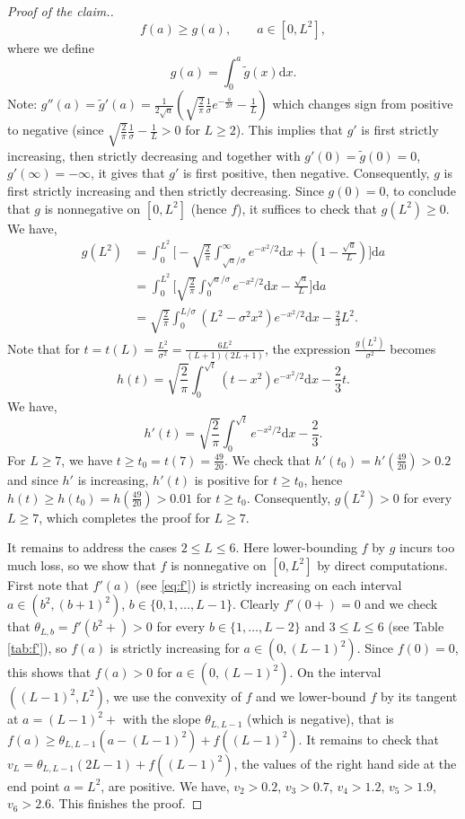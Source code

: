 \documentclass[10pt]{article}
\newcommand{\dd}{\mathrm{d}}
\newcommand{\1}{\textbf{1}}
\theoremstyle{remark}
\theoremstyle{definition}
\begin{document}
\begin{proof}[Proof of the claim.]
\[
f(a) \geq g(a), \qquad a \in [0,L^2],
\]
where we define
\[
g(a) = \int_0^a \tilde g(x)\dd x.
\]
Note: $g''(a) = \tilde g'(a) = \frac{1}{2\sqrt{a}}\left(\sqrt{\frac{2}{\pi}}\frac{1}{\sigma}e^{-\frac{a}{2\sigma}} - \frac{1}{L}\right)$ which changes sign from positive to negative (since $\sqrt{\frac{2}{\pi}}\frac{1}{\sigma} - \frac{1}{L} > 0$ for $L \geq 2$). This implies that $g'$ is first strictly increasing, then strictly decreasing and together with $g'(0) = \tilde g(0) = 0$, $g'(\infty) = -\infty$, it gives that $g'$ is first positive, then negative. Consequently, $g$ is first strictly increasing and then strictly decreasing. Since $g(0) = 0$, to conclude that $g$ is nonnegative on $[0,L^2]$ (hence $f$), it suffices to check that $g(L^2) \geq 0$. We have,
\begin{align*}
g(L^2) &= \int_0^{L^2}\Bigg[-\sqrt{\frac{2}{\pi}}\int_{\sqrt{a}/\sigma}^{\infty}e^{-x^2/2}\dd x + \left(1 -  \frac{\sqrt{a}}{L}\right)\Bigg] \dd a \\
&=\int_0^{L^2}\Bigg[\sqrt{\frac{2}{\pi}}\int_{0}^{\sqrt{a}/\sigma}e^{-x^2/2}\dd x - \frac{\sqrt{a}}{L} \Bigg] \dd a \\
&= \sqrt{\frac{2}{\pi}}\int_0^{L/\sigma} (L^2-\sigma^2x^2)e^{-x^2/2} \dd x - \frac{2}{3}L^2.
\end{align*}
Note that for $t = t(L) = \frac{L^2}{\sigma^2} = \frac{6L^2}{(L+1)(2L+1)}$, the expression $\frac{g(L^2)}{\sigma^2}$ becomes
\[
h(t) = \sqrt{\frac{2}{\pi}}\int_0^{\sqrt{t}} (t-x^2)e^{-x^2/2} \dd x - \frac{2}{3}t.
\]
We have,
\[
h'(t) = \sqrt{\frac{2}{\pi}}\int_0^{\sqrt{t}} e^{-x^2/2} \dd x - \frac{2}{3}.
\]
For $L \geq 7$, we have $t \geq t_0 = t(7) = \frac{49}{20}$. We check that $h'(t_0) = h'(\frac{49}{20})> 0.2$ and since $h'$ is increasing, $h'(t)$ is positive for $t \geq t_0$, hence $h(t) \geq h(t_0) = h(\frac{49}{20}) > 0.01$ for $t \geq t_0$. Consequently, $g(L^2) > 0$ for every $L \geq 7$, which completes the proof for $L \geq 7$.

It remains to address the cases $2 \leq L \leq 6$. Here lower-bounding $f$ by $g$ incurs too much loss, so we show that $f$ is nonnegative on $[0,L^2]$ by direct computations. First note that $f'(a)$ (see \eqref{eq:f'}) is strictly increasing on each interval $a \in (b^2,(b+1)^2)$, $b \in \{0,1,\ldots, L-1\}$. Clearly $f'(0+) = 0$ and we check that $\theta_{L,b} = f'(b^2+) > 0$ for every $b \in \{1,\ldots,L-2\}$ and $3 \leq L \leq 6$ (see Table \ref{tab:f'}), so $f(a)$ is strictly increasing for $a \in (0,(L-1)^2)$. Since $f(0) = 0$, this shows that $f(a) > 0$ for $a \in (0,(L-1)^2)$. On the interval $((L-1)^2,L^2)$, we use the convexity of $f$ and we lower-bound $f$ by its tangent at $a = (L-1)^2+$ with the slope $\theta_{L,L-1}$ (which is negative), that is $f(a) \geq \theta_{L,L-1}(a - (L-1)^2) + f((L-1)^2)$. It remains to check that $v_L = \theta_{L,L-1}(2L-1) + f((L-1)^2)$, the values of the right hand side at the end point $a = L^2$, are positive. We have, $v_2 > 0.2$, $v_3 > 0.7$, $v_4 > 1.2$, $v_5 > 1.9$, $v_6 > 2.6$. This finishes the proof.
\end{proof}
\end{document}
